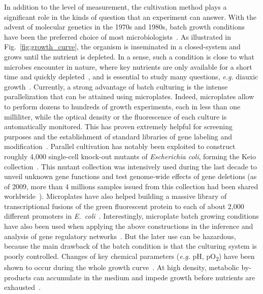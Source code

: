 In addition to the level of measurement, the cultivation method plays a significant role in the kinds of question that an experiment can answer.
With the advent of molecular genetics in the 1970s and 1980s, batch growth conditions have been the preferred choice of most microbiologists~\cite{hoskisson_continuous_2005}.
As illustrated in Fig.~\ref{fig:growth_curve}, the organism is inseminated in a closed-system and grows until the nutrient is depleted.
In a sense, such a condition is close to what microbes encounter in nature, where key nutrients are only available for a short time and quickly depleted~\cite{mcarthur_microbial_2006,menge_nitrogen_2012,hobbie_microbes_2013}, and is essential to study many questions, \textit{e.g.} diauxic growth~\cite{kremling_understanding_2015}.
Currently, a strong advantage of batch culturing is the intense parallelization that can be attained using microplates.
Indeed, microplates allow to perform dozens to hundreds of growth experiments, each in less than one milliliter, while the optical density or the fluorescence of each culture is automatically monitored.
This has proven extremely helpful for screening purposes and the establishment of standard libraries of gene labeling and modification~\cite{baba_construction_2006,zaslaver_comprehensive_2006}.
Parallel cultivation has notably been exploited to construct roughly 4,000 single-cell knock-out mutants of \textit{Escherichia coli}, forming the Keio collection~\cite{baba_construction_2006}.
This mutant collection was intensively used during the last decade to unveil unknown gene functions and test genome-wide effects of gene deletions (as of 2009, more than 4 millions samples issued from this collection had been shared worldwide~\cite{yamamoto_update_2009}).
Microplates have also helped building a massive library of transcriptional fusions of the green fluorescent protein to each of about 2,000 different promoters in \textit{E.~coli}~\cite{zaslaver_comprehensive_2006}.
Interestingly, microplate batch growing conditions have also been used when applying the above constructions in the inference and analysis of gene regulatory networks~\cite{gerosa_dissecting_2013,berthoumieux_shared_2013,keren_promoters_2013,
ronen_assigning_2002,stefan_inference_2015}.
But the later use can be hazardous, because the main drawback of the batch condition is that the culturing system is poorly controlled.
Changes of key chemical parameters (\textit{e.g.} pH, pO\textsubscript{2}) have been shown to occur during the whole growth curve~\cite{bekker_changes_2007}. 
At high density, metabolic by-products can accumulate in the medium and impede growth before nutrients are exhausted~\cite{ackerman_accumulation_1974,lenski_chemical_2002,luli_comparison_1990}.
